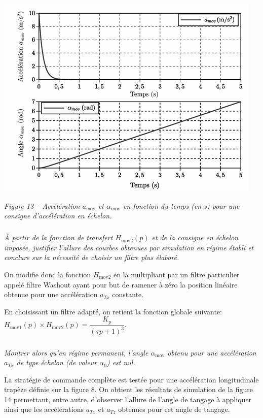 \documentclass[10pt,fleqn]{article} %
\begin{document}
\begin{center}
\includegraphics[width=.9\linewidth]{images/fig_13}

\textit{Figure 13 -- Accélération $a_{\text{mov}}$ et $\alpha_{\text{mov}}$  en fonction du temps (en s) pour une consigne d'accélération en échelon.}
\end{center}


\subparagraph{}\textit{À partir de la fonction de transfert $H_{\text{mov2}}(p)$ et de la consigne en échelon imposée, justifier l'allure des courbes obtenues par simulation en régime établi et conclure sur la nécessité de choisir un filtre plus élaboré.}


On modifie donc la fonction $H_{\text{mov2}}$ en la multipliant par un filtre particulier appelé filtre Washout ayant pour but de ramener à zéro la position linéaire obtenue pour une accélération $a_{Tx}$ constante. 

En choisissant un filtre adapté, on retient la fonction globale suivante: $H_{\text{mov1}}(p)\times H_{\text{mov2}}(p)=\dfrac{K_p}{\left(\tau p+1\right)^3}$.


\subparagraph{}\textit{Montrer alors qu’en régime permanent, l’angle $\alpha_{\text{mov}}$ obtenu pour une accélération $a_{Tx}$ de type échelon (de valeur $\alpha_0$) est nul.}

La stratégie de commande complète est testée pour une accélération longitudinale trapèze définie sur la figure 8. 
On obtient les résultats de simulation de la figure 14 permettant, entre autre, d'observer l'allure de l'angle de tangage à appliquer ainsi que les accélérations $a_{Tx}$ et $a_{Tz}$ obtenues pour cet angle de tangage. 
\end{document}
